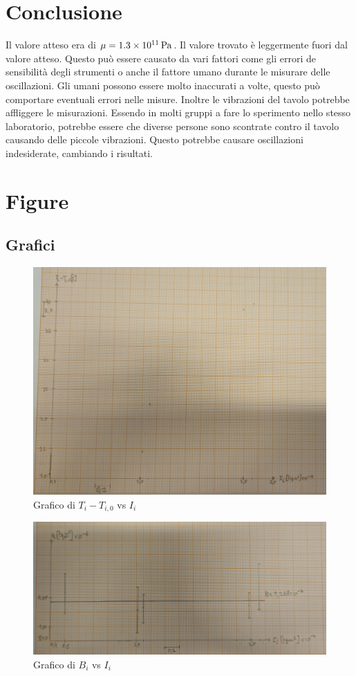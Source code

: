\documentclass[a4paper]{article}
\begin{document}
\section{Conclusione}
Il valore atteso era di $\mu = \SI{1.3E11}{Pa}$. Il valore trovato è leggermente fuori dal valore atteso. Questo può essere causato da vari fattori come gli errori de sensibilità degli strumenti o anche il fattore umano durante le misurare delle oscillazioni. Gli umani possono essere molto inaccurati a volte, questo può comportare eventuali errori nelle misure. Inoltre le vibrazioni del tavolo potrebbe affliggere le misurazioni. Essendo in molti gruppi a fare lo sperimento nello stesso laboratorio, potrebbe essere che diverse persone sono scontrate contro il tavolo causando delle piccole vibrazioni. Questo potrebbe causare oscillazioni indesiderate, cambiando i risultati. 

\newpage
\section{Figure}
\subsection{Grafici}
\begin{figure}[!ht]
    \centering
    \includegraphics[width=\textwidth]{fotocoulomb/modulocoulomb_TI.jpg}
    \caption{Grafico di $T_i-T_{i,0}$ vs $I_i$}
\end{figure}

\begin{figure}[!ht]
    \centering
    \includegraphics[width=\textwidth]{fotocoulomb/modulocoulomb_BI.jpg}
    \caption{Grafico di $B_i$ vs $I_i$}
\end{figure}
\end{document}
